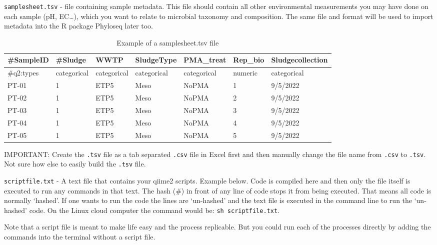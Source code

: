 \documentclass[
]{book}
\begin{document}
\hfill\break

\texttt{samplesheet.tsv} - file containing sample metadata. This file should contain all other environmental measurements you may have done on each sample (pH, EC\ldots), which you want to relate to microbial taxonomy and composition. The same file and format will be used to import metadata into the R package Phyloseq later too.

\begin{table}

\caption{\label{tab:metadata}Example of a samplesheet.tsv file}
\centering
\fontsize{10}{12}\selectfont
\begin{tabular}[t]{l|l|l|l|l|l|l}
\hline
\#SampleID & \#Sludge & WWTP & SludgeType & PMA\_treat & Rep\_bio & Sludgecollection\\
\hline
\#q2:types & categorical & categorical & categorical & categorical & numeric & categorical\\
\hline
PT-01 & 1 & ETP5 & Meso & NoPMA & 1 & 9/5/2022\\
\hline
PT-02 & 1 & ETP5 & Meso & NoPMA & 2 & 9/5/2022\\
\hline
PT-03 & 1 & ETP5 & Meso & NoPMA & 3 & 9/5/2022\\
\hline
PT-04 & 1 & ETP5 & Meso & NoPMA & 4 & 9/5/2022\\
\hline
PT-05 & 1 & ETP5 & Meso & NoPMA & 5 & 9/5/2022\\
\hline
\end{tabular}
\end{table}

\hfill\break

IMPORTANT: Create the \texttt{.tsv} file as a tab separated \texttt{.csv} file in Excel first and then manually change the file name from \texttt{.csv} to \texttt{.tsv}. Not sure how else to easily build the \texttt{.tsv} file.

\hfill\break

\texttt{scriptfile.txt} - A text file that contains your qiime2 scripts. Example below. Code is compiled here and then only the file itself is executed to run any commands in that text. The hash (\#) in front of any line of code stops it from being executed. That means all code is normally `hashed'. If one wants to run the code the lines are `un-hashed' and the text file is executed in the command line to run the `un-hashed' code. On the Linux cloud computer the command would be: \texttt{sh\ scriptfile.txt}.

Note that a script file is meant to make life easy and the process replicable. But you could run each of the processes directly by adding the commands into the terminal without a script file.
\end{document}
